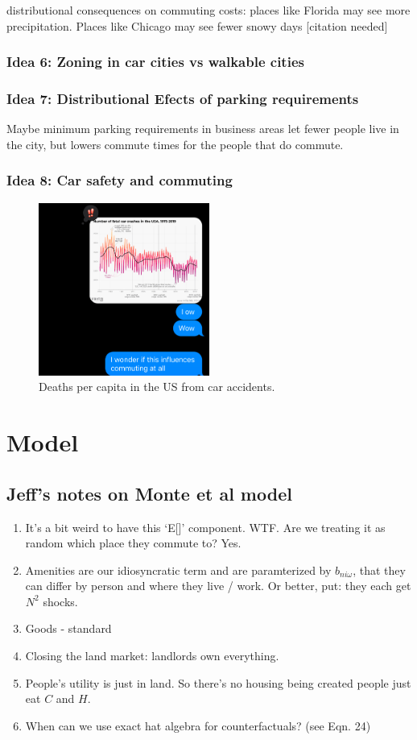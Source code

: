 \documentclass{article}
\begin{document}
distributional consequences on commuting costs:
places like Florida may see more precipitation. Places like Chicago may see fewer snowy days [citation needed]
\subsubsection{Idea 6: Zoning in car cities vs walkable cities}

\subsubsection{Idea 7: Distributional Efects of parking requirements}
Maybe minimum parking requirements in business areas let fewer people live in the city, but lowers commute times for the people that do commute.
\subsubsection{Idea 8: Car safety and commuting}
\begin{figure}
    \centering
    \includegraphics[width=0.5\textwidth]{img/cardeaths.jpeg}
    \caption{Deaths per capita in the US from car accidents.}
    \label{fig:car_deaths}
\end{figure}
\section{Model}

\subsection{Jeff's notes on Monte et al model}
\begin{enumerate}
\item It's a bit weird to have this `E[]' component. WTF. Are we treating it as random which place they commute to? Yes.
\item Amenities are our idiosyncratic term and are paramterized by $b_{ni\omega}$, that they can differ by person and where they live / work. Or better, put: they each get $N^2$ shocks.
\item Goods - standard
\item Closing the land market: landlords own everything.
\item People's utility is just in land. So there's no housing being created people just eat $C$ and $H$.
\item  When can we use exact hat algebra for counterfactuals? (see Eqn. 24)
\end{enumerate}
\end{document}
